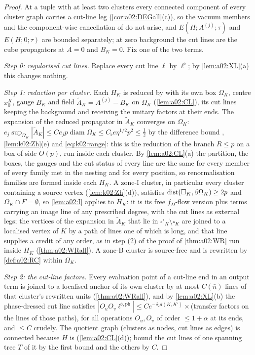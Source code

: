 \begin{proof}
At a tuple with at least two clusters every connected component of every cluster graph carries a cut-line leg (\cref{cor:a02:DEGall}(c)), so the vacuum members and the component-wise cancellation of \cite[p.~667]{K1} do not arise, and $E(H;A^{(j)};\tau)$ and $E(H;0;\tau)$ are bounded separately; at zero background the cut lines are the cube propagators at $A=0$ and $B_K=0$. Fix one of the two terms.

\emph{Step 0: regularised cut lines.} Replace every cut line $\ell$ by $\ell^\flat$; by \cref{lem:a02:XL}(a) this changes nothing.

\emph{Step 1: reduction per cluster.} Each $H_K$ is reduced by \cite[(3.43)--(3.55)]{K1} with its own box $\Omega_K$, centre $x_0^K$, gauge $B_K$ and field $\tilde A_K=A^{(j)}-B_K$ on $\Omega_K$ (\cref{lem:a02:CL}), its cut lines keeping the background and receiving the unitary factors \cite[(3.46)]{K1} at their ends. The expansion of the reduced propagator in $\tilde A_K$ converges on $\Omega_K$: $e_j\sup_{\Omega_K}|\tilde A_K|\le Ce_jp\operatorname{diam}\Omega_K\le C_\flat e\eta^{1/2}p^2\le\frac12$ by the difference bound \cite[(3.45)]{K1}, \cref{lem:k02:Zh}(e) and \eqref{eq:k02:range}: this is the reduction of the branch $R\le p$ on a box of side $O(p)$, run inside each cluster. By \cref{lem:a02:CL}(a) the partition, the boxes, the gauges and the cut status of every line are the same for every member of every family met in the nesting and for every position, so renormalisation families are formed inside each $H_K$. A zone-I cluster, in particular every cluster containing a source vertex (\cref{lem:k02:Zh}(d)), satisfies $\operatorname{dist}(\square_K,\partial\Omega_K)\ge2p$ and $\Omega_K\cap F=\emptyset$, so \cref{lem:a02:I} applies to $H_K$: it is its free $f_D$-flow version plus terms carrying an image line of any prescribed degree, with the cut lines as external legs; the vertices of the expansion in $\tilde A_K$ that lie in $\square'_K\setminus\square_K$ are joined to a localised vertex of $K$ by a path of lines one of which is long, and that line supplies a credit of any order, as in step (2) of the proof of \cref{thm:a02:WR} run inside $H_K$ (\cref{thm:a02:WRall}). A zone-B cluster is source-free and is rewritten by \cref{def:a02:RC} within $\Omega_K$.

\emph{Step 2: the cut-line factors.} Every evaluation point of a cut-line end in an output term is joined to a localised anchor of its own cluster by at most $C(\bar n)$ lines of that cluster's rewritten units (\cref{thm:a02:WRall}), and by \cref{lem:a02:XL}(b) the phase-dressed cut line satisfies $|O_uO_v\ell^{\flat,\mathrm{ph}}|\le Ce^{-\delta_2d(K,K')}\times$(transfer factors on the lines of those paths), for all operations $O_u,O_v$ of order $\le1+\alpha$ at its ends, and $\le C$ crudely. The quotient graph (clusters as nodes, cut lines as edges) is connected because $H$ is (\cref{lem:a02:CL}(d)); bound the cut lines of one spanning tree $T$ of it by the first bound and the others by $C$.


\end{proof}
